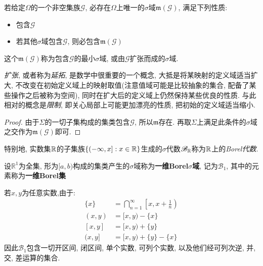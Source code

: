 \begin{proposition}
    若给定$\Omega$的一个非空集族$\mathscr{G}$, 必存在$\Omega$上唯一的$\sigma$域$\mathfrak{m}(\mathscr{G})$, 满足下列性质:
    \begin{itemize}
        \item 包含$\mathscr{G}$
        \item 若其他$\sigma$域包含$\mathscr{G}$, 则必包含$\mathfrak{m}(\mathscr{G})$
    \end{itemize}
    这个$\mathfrak{m}(\mathscr{G})$称为包含$\mathscr{G}$的最小$\sigma$域, 或由$\mathscr{G}$扩张而成的$\sigma$域.
\end{proposition}

\emph{扩张}, 或者称为\emph{延拓}, 是数学中很重要的一个概念, 大抵是将某映射的定义域适当扩大, 不改变在初始定义域上的映射取值(注意值域可能是比较抽象的集合, 配备了某些操作之后被称为空间), 同时在扩大后的定义域上仍然保持某些优良的性质. 与此相对的概念是\emph{限制}, 即关心局部上可能更加漂亮的性质, 把初始的定义域适当缩小.

\begin{proof}
    由于$\Sigma$的一切子集构成的集类包含$\mathscr{G}$, 所以$\mathfrak{m}$存在. 再取$\Sigma$上满足此条件的$\sigma$域之交作为$\mathfrak{m}(\mathscr{G})$即可.
\end{proof}

特别地, 实数集$\mathbb{R}$的子集族$\{(-\infty,x] : x\in\mathbb{R}\}$生成的$\sigma$代数$\mathscr{B}_{\mathbb{R}}$称为$\mathbb{R}$上的\emph{Borel代数}.

\begin{definition}[Borel集]
    设$\mathbb{R}^1$为全集, 形为$[a,b)$构成的集类产生的$\sigma$域称为\textbf{一维Borel$\sigma$域}, 记为$\mathscr{B}_1$, 其中的元素称为\textbf{一维Borel集}
\end{definition}

若$x,y$为任意实数,由于:
\begin{align*}
    \{x\}  & =  \bigcap_{n=1}^{\infty}\left[x, x+\frac{1}{n}\right) \\
    (x, y) & =  [x, y)-\{x\}                                        \\
    [x, y] & =  [x, y)+\{y\}                                        \\
    (x, y] & =  [x, y)+\{y\}-\{x\}
\end{align*}
因此$\mathscr{B}_1$包含一切开区间, 闭区间, 单个实数, 可列个实数, 以及他们经可列次逆, 并, 交, 差运算的集合.

